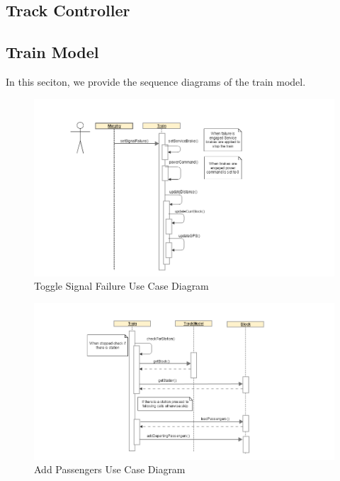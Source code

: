\documentclass[]{article}
\begin{document}
\subsection{Track Controller}

\subsection{Train Model}
In this seciton, we provide the sequence diagrams of the train model.
\begin{figure}[H]
	\centering
	\includegraphics[scale=.3]{train_model_sqd_toggle_signal_failure.png}
	\caption{Toggle Signal Failure Use Case Diagram}
\end{figure}

\begin{figure}[H]
	\centering
	\includegraphics[scale=.3]{train_model_sqd_add_passengers.png}
	\caption{Add Passengers Use Case Diagram}
\end{figure}
\end{document}
